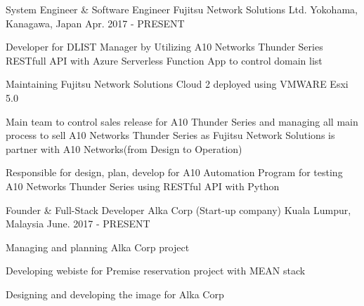 

\begin{cventries}

  \cventry
	{System Engineer \& Software Engineer} %
    {Fujitsu Network Solutions Ltd. } %
    {Yokohama, Kanagawa, Japan} %
    {Apr. 2017 - PRESENT} %
    {
      \begin{cvitems} %
        \item {Developer for DLIST Manager by Utilizing A10 Networks Thunder Series RESTfull API with Azure Serverless Function App to control domain list}
        \item {Maintaining Fujitsu Network Solutions Cloud 2 deployed using VMWARE Esxi 5.0 }
        \item {Main team to control sales release for A10 Thunder Series and managing all main process to sell  A10 Networks Thunder Series as Fujitsu Network Solutions is partner with A10 Networks(from Design to Operation)}
        \item{Responsible for design, plan, develop for A10 Automation Program for testing A10 Networks Thunder Series using RESTful API with Python}
      \end{cvitems}
    }

  \cventry
	{Founder \& Full-Stack Developer } %
	{Alka Corp (Start-up company)} %
    {Kuala Lumpur, Malaysia} %
    {June. 2017 - PRESENT} %
    {
      \begin{cvitems} %
        \item {Managing and planning Alka Corp project }
        \item {Developing webiste for Premise reservation project with MEAN stack}
        \item {Designing and developing the image for Alka Corp }
      \end{cvitems}
    }
	

\end{cventries}
